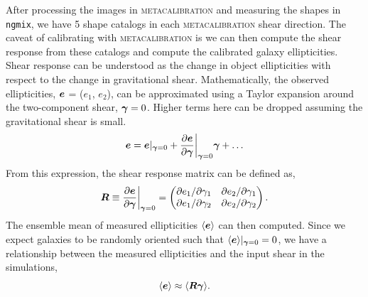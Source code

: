 \documentclass[fleqn,usenatbib]{mnras}
\begin{document}
After processing the images in \textsc{metacalibration} and measuring the shapes in \texttt{ngmix}, we have 5 shape catalogs in each \textsc{metacalibration} shear direction. The caveat of calibrating with \textsc{metacalibration} is we can then compute the shear response from these catalogs and compute the calibrated galaxy ellipticities. Shear response can be understood as the change in object ellipticities with respect to the change in gravitational shear. Mathematically, the observed ellipticities, $\vb*{e}$ = ($e_{1}$, $e_{2}$), can be approximated using a Taylor expansion around the two-component shear, $\vb*{\gamma}=0$. Higher terms here can be dropped assuming the gravitational shear is small. 
\begin{equation}
    \vb*{e} = \vb*{e}\rvert_{\vb*{\gamma}=0} + \frac{\partial \vb*{e}}{\partial \vb*{\gamma}}\bigg\rvert_{\vb*{\gamma}=0}\vb*{\gamma} + \ldots
\end{equation}
From this expression, the shear response matrix can be defined as, 
\begin{equation}
    \vb*{R} \equiv \frac{\partial \vb*{e}}{\partial \vb*{\gamma}}\bigg\rvert_{\vb*{\gamma}=0} = 
    \begin{pmatrix}
        \partial e_{1}/\partial \gamma_{1} & \partial e_{2}/\partial \gamma_{1} \\ 
        \partial e_{1}/\partial \gamma_{2} & \partial e_{2}/\partial \gamma_{2}
    \end{pmatrix}. 
\end{equation}
The ensemble mean of measured ellipticities $\langle\vb*{e}\rangle$ can then computed. Since we expect galaxies to be randomly oriented such that $\langle\vb*{e}\rangle\rvert_{\vb*{\gamma}=0}=0$, we have a relationship between the measured ellipticities and the input shear in the simulations, 
\begin{equation}
    \langle\vb*{e}\rangle \approx \langle \vb*{R}\vb*{\gamma} \rangle. 
\end{equation} 
\end{document}
